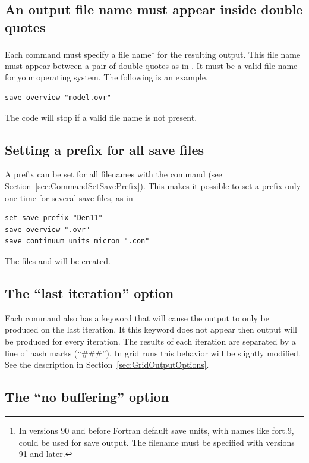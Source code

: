 \subsection{An output file name must appear inside double quotes}

Each  command must specify a file name\footnote{In versions 90 and before Fortran default save units, with names
like fort.9, could be used for save output.  The filename must be specified
with versions 91 and later.} for the resulting output.
This file name must appear between a pair of double quotes as in
.
It must be a valid file name for your operating system.
The following is an example.
\begin{verbatim}
save overview "model.ovr"
\end{verbatim}
The code will stop if a valid file name is not present.

\subsection{Setting a prefix for all save files}

A prefix can be set for all filenames with the
 command 
(see Section~\ref{sec:CommandSetSavePrefix}).
This makes it possible to set a prefix only one time for several save files, as in
\begin{verbatim}
set save prefix "Den11"
save overview ".ovr"
save continuum units micron ".con"
\end{verbatim}
The files  and 
will be created. 

\subsection{The ``last iteration'' option}

Each  command also has a keyword  that will cause the output
to only be produced on the last iteration.
It this keyword does not appear
then output will be produced for every iteration.
The results of each
iteration are separated by a line of hash marks (``\#\#\#'').
In grid runs this behavior will be slightly modified. See the
description in Section~\ref{sec:GridOutputOptions}.

\subsection{The ``no buffering'' option}

